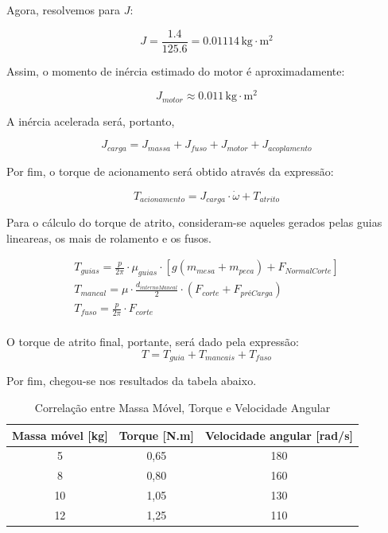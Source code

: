 Agora, resolvemos para \( J \):

\begin{equation}
    J = \frac{1.4}{125.6} = 0.01114 \, \text{kg} \cdot \text{m}^2
\end{equation}

Assim, o momento de inércia estimado do motor é aproximadamente:

\begin{equation}
    J_{motor} \approx 0.011 \, \text{kg} \cdot \text{m}^2
\end{equation}

A inércia acelerada será, portanto, 

\begin{equation}
    J_{carga} = J_{massa} + J_{fuso} + J_{motor} + J_{acoplamento} 
\end{equation}

Por fim, o torque de acionamento será obtido através da expressão:

\begin{equation}
    T_{acionamento} = J_{carga} \cdot \dot \omega + T_{atrito}
\end{equation}

Para o cálculo do torque de atrito, consideram-se aqueles gerados pelas guias lineareas, os mais de rolamento e os fusos. 

\begin{align}
    T_{guias} = \frac{p}{2\pi} \cdot \mu_{guias} \cdot [g(m_{mesa}+m_{peca})+F_{NormalCorte}] \\
    T_{mancal} = \mu \cdot \frac{d_{internoMancal}}{2} \cdot (F_{corte}+F_{préCarga}) \\
    T_{fuso} = \frac{p}{2\pi}\cdot F_{corte} \\
\end{align}

O torque de atrito final, portante, será dado pela expressão: 
\begin{equation}
    T = T_{guia} + T_{mancais} + T_{fuso}
\end{equation}

Por fim, chegou-se nos resultados da tabela abaixo. 

\begin{table}[h!] 
    \centering 
    \begin{tabular}{|c|c|c|} \hline 
        \textbf{Massa móvel [kg]} & \textbf{Torque [N.m]} & \textbf{Velocidade angular [rad/s]} \\ \hline 
        5 & 0,65 & 180 \\ \hline 
        8 & 0,80 & 160 \\ \hline 
        10 & 1,05 & 130 \\ \hline 
        12 & 1,25 & 110 \\ \hline 
    \end{tabular} 
    \caption{Correlação entre Massa Móvel, Torque e Velocidade Angular}  
\end{table}

